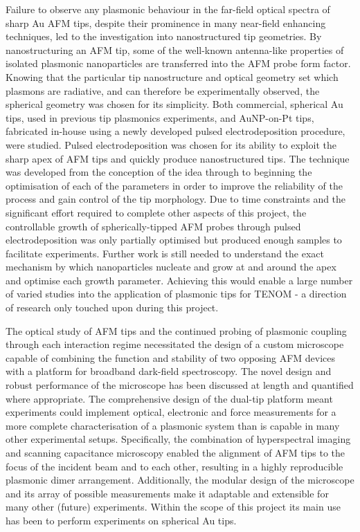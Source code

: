 \documentclass[12pt, a4paper, oneside]{book}
\begin{document}
Failure to observe any plasmonic behaviour in the far-field optical spectra of sharp Au AFM tips, despite their prominence in many near-field enhancing techniques, led to the investigation into nanostructured tip geometries. By nanostructuring an AFM tip, some of the well-known antenna-like properties of isolated plasmonic nanoparticles are transferred into the AFM probe form factor. Knowing that the particular tip nanostructure and optical geometry set which plasmons are radiative, and can therefore be experimentally observed, the spherical geometry was chosen for its simplicity. Both commercial, spherical Au tips, used in previous tip plasmonics experiments, and AuNP-on-Pt tips, fabricated in-house using a newly developed pulsed electrodeposition procedure, were studied. Pulsed electrodeposition was chosen for its ability to exploit the sharp apex of AFM tips and quickly produce nanostructured tips. The technique was developed from the conception of the idea through to beginning the optimisation of each of the parameters in order to improve the reliability of the process and gain control of the tip morphology. Due to time constraints and the significant effort required to complete other aspects of this project, the controllable growth of spherically-tipped AFM probes through pulsed electrodeposition was only partially optimised but produced enough samples to facilitate experiments.
Further work is still needed to understand the exact mechanism by which nanoparticles nucleate and grow at and around the apex and optimise each growth parameter. Achieving this would enable a large number of varied studies into the application of plasmonic tips for TENOM - a direction of research only touched upon during this project.

The optical study of AFM tips and the continued probing of plasmonic coupling through each interaction regime necessitated the design of a custom microscope capable of combining the function and stability of two opposing AFM devices with a platform for broadband dark-field spectroscopy. The novel design and robust performance of the microscope has been discussed at length and quantified where appropriate. The comprehensive design of the dual-tip platform meant experiments could implement optical, electronic and force measurements for a more complete characterisation of a plasmonic system than is capable in many other experimental setups. Specifically, the combination of hyperspectral imaging and scanning capacitance microscopy enabled the alignment of AFM tips to the focus of the incident beam and to each other, resulting in a highly reproducible plasmonic dimer arrangement. Additionally, the modular design of the microscope and its array of possible measurements make it adaptable and extensible for many other (future) experiments. Within the scope of this project its main use has been to perform experiments on spherical Au tips.
\end{document}
